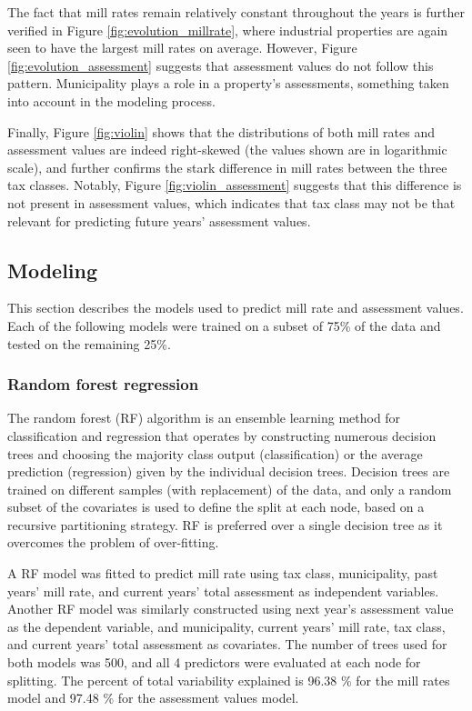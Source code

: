 \documentclass{article}
\begin{document}
The fact that mill rates remain relatively constant throughout the years is further verified in Figure \ref{fig:evolution_millrate}, where industrial properties are again seen to have the largest mill rates on average. However, Figure \ref{fig:evolution_assessment} suggests that assessment values do not follow this pattern. Municipality plays a role in a property's assessments, something taken into account in the modeling process.



Finally, Figure \ref{fig:violin} shows that the distributions of both mill rates and assessment values are indeed right-skewed (the values shown are in logarithmic scale), and further confirms the stark difference in mill rates between the three tax classes. Notably, Figure \ref{fig:violin_assessment} suggests that this difference is not present in assessment values, which indicates that tax class may not be that relevant for predicting future years' assessment values.



\FloatBarrier


\subsection{Modeling} \label{section:model}

This section describes the models used to predict mill rate and assessment values. Each of the following models were trained on a subset of 75\% of the data and tested on the remaining 25\%.

\subsubsection{Random forest regression}

The random forest (RF) algorithm is an ensemble learning method for classification and regression that operates by constructing numerous decision trees and choosing the majority class output (classification) or the average prediction (regression) given by the individual decision trees. Decision trees are trained on different samples (with replacement) of the data, and only a random subset of the covariates is used to define the split at each node, based on a recursive partitioning strategy. RF is preferred over a single decision tree as it overcomes the problem of over-fitting.

A RF model was fitted to predict mill rate using tax class, municipality, past years' mill rate, and current years' total assessment as independent variables. Another RF model was similarly constructed using next year's assessment value as the dependent variable, and municipality, current years' mill rate, tax class, and current years' total assessment as covariates. The number of trees used for both models was 500, and all 4 predictors were evaluated at each node for splitting. The percent of total variability explained is 96.38 \% for the mill rates model and 97.48 \% for the assessment values model. 
\end{document}

